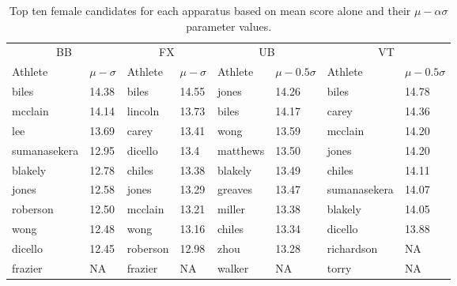 \documentclass[12pt]{article}
\begin{document}
\begin{table}
  \caption{Top ten female candidates for each apparatus based on mean score alone and 
  their $\mu - \alpha \sigma$ parameter values.}
  \label{table:1}
\centering
\begin{tabular}[t]{llllllll}
 \toprule
  \multicolumn{2}{c}{BB} & \multicolumn{2}{c}{FX} & \multicolumn{2}{c}{UB} & \multicolumn{2}{c}{VT}\\
  \cmidrule(lr){1-2}\cmidrule(lr){3-4}\cmidrule(lr){5-6}\cmidrule(lr){7-8}
Athlete & $\mu - \sigma$ & Athlete & $\mu - \sigma$ & Athlete & $\mu - 0.5 \sigma$ & Athlete & $\mu - 0.5 \sigma$\\
\midrule
biles & 14.38 & biles & 14.55 & jones & 14.26 & biles & 14.78\\

mcclain & 14.14 & lincoln & 13.73 & biles & 14.17 & carey & 14.36\\

lee & 13.69 & carey & 13.41 & wong & 13.59 & mcclain & 14.20\\

sumanasekera & 12.95 & dicello & 13.4 & matthews & 13.50 & jones & 14.20\\

blakely & 12.78 & chiles & 13.38 & blakely & 13.49 & chiles & 14.11\\

jones & 12.58 & jones & 13.29 & greaves & 13.47 & sumanasekera & 14.07\\

roberson & 12.50 & mcclain & 13.21 & miller & 13.38 & blakely & 14.05\\

wong & 12.48 & wong & 13.16 & chiles & 13.34 & dicello & 13.88\\

dicello & 12.45 & roberson & 12.98 & zhou & 13.28 & richardson & NA\\

frazier & NA & frazier & NA & walker & NA & torry & NA\\
\bottomrule
\end{tabular}
\end{table}
\end{document}
